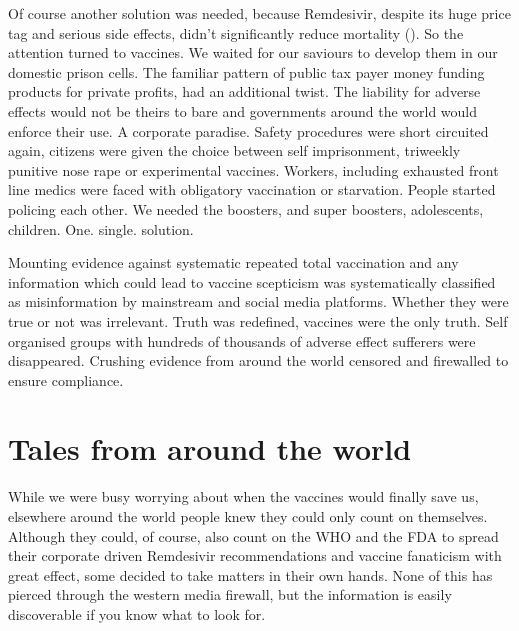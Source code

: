 \documentclass[11pt,a4paper]{article}
\begin{document}
Of course another solution was needed, because Remdesivir, despite its huge price tag and serious side effects, didn’t significantly reduce mortality (\cite{Ader21}). So the attention turned to vaccines. We waited for our saviours to develop them in our domestic prison cells. The familiar pattern of public tax payer money funding products for private profits, had an additional twist. The liability for adverse effects would not be theirs to bare and governments around the world would enforce their use. A corporate paradise. Safety procedures were short circuited again, citizens were given the choice between self imprisonment, triweekly punitive nose rape or experimental vaccines. Workers, including exhausted front line medics were faced with obligatory vaccination or starvation. People started policing each other. We needed the boosters, and super boosters, adolescents, children. One. single. solution.

Mounting evidence against systematic repeated total vaccination and any information which could lead to vaccine scepticism was systematically classified as misinformation by mainstream and social media platforms. Whether they were true or not was irrelevant. Truth was redefined, vaccines were the only truth. Self organised groups with hundreds of thousands of adverse effect sufferers were disappeared. Crushing evidence from around the world censored and firewalled to ensure compliance. 

\section*{Tales from around the world}

While we were busy worrying about when the vaccines would finally save us, elsewhere around the world people knew they could only count on themselves. Although they could, of course, also count on the WHO and the FDA to spread their corporate driven Remdesivir recommendations and vaccine fanaticism with great effect, some decided to take matters in their own hands. None of this has pierced through the western media firewall, but the information is easily discoverable if you know what to look for.
\end{document}
